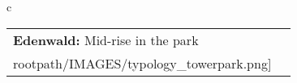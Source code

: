 \begin{table}[H]
        \begin{tabular}{c}
        \begin{tabular}{m{1.5in} m{2in}}
\textbf{Edenwald:} {Mid-rise in the park} & \texttt{[image: \\rootpath/IMAGES/typology\_towerpark.png]}
\end{tabular}\end{tabular}
        \end{table}